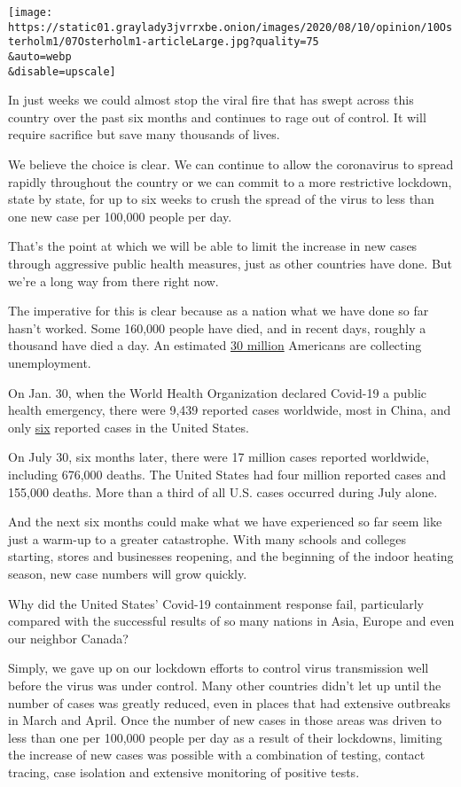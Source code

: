 \texttt{[image: https://static01.graylady3jvrrxbe.onion/images/2020/08/10/opinion/10Osterholm1/07Osterholm1-articleLarge.jpg?quality=75\\\&auto=webp\\\&disable=upscale]}

In just weeks we could almost stop the viral fire that has swept across
this country over the past six months and continues to rage out of
control. It will require sacrifice but save many thousands of lives.

We believe the choice is clear. We can continue to allow the coronavirus
to spread rapidly throughout the country or we can commit to a more
restrictive lockdown, state by state, for up to six weeks to crush the
spread of the virus to less than one new case per 100,000 people per
day.

That's the point at which we will be able to limit the increase in new
cases through aggressive public health measures, just as other countries
have done. But we're a long way from there right now.

The imperative for this is clear because as a nation what we have done
so far hasn't worked. Some 160,000 people have died, and in recent days,
roughly a thousand have died a day. An estimated
\href{https://www.nytimes3xbfgragh.onion/2020/08/06/business/economy/unemployment-claims.html}{30
million} Americans are collecting unemployment.

On Jan. 30, when the World Health Organization declared Covid-19 a
public health emergency, there were 9,439 reported cases worldwide, most
in China, and only
\href{https://www.cnn.com/asia/live-news/coronavirus-outbreak-01-30-20-intl-hnk/h_4263dd94af73bd404b425b133637a0e7}{six}
reported cases in the United States.

On July 30, six months later, there were 17 million cases reported
worldwide, including 676,000 deaths. The United States had four million
reported cases and 155,000 deaths. More than a third of all U.S. cases
occurred during July alone.

And the next six months could make what we have experienced so far seem
like just a warm-up to a greater catastrophe. With many schools and
colleges starting, stores and businesses reopening, and the beginning of
the indoor heating season, new case numbers will grow quickly.

Why did the United States' Covid-19 containment response fail,
particularly compared with the successful results of so many nations in
Asia, Europe and even our neighbor Canada?

Simply, we gave up on our lockdown efforts to control virus transmission
well before the virus was under control. Many other countries didn't let
up until the number of cases was greatly reduced, even in places that
had extensive outbreaks in March and April. Once the number of new cases
in those areas was driven to less than one per 100,000 people per day as
a result of their lockdowns, limiting the increase of new cases was
possible with a combination of testing, contact tracing, case isolation
and extensive monitoring of positive tests.

